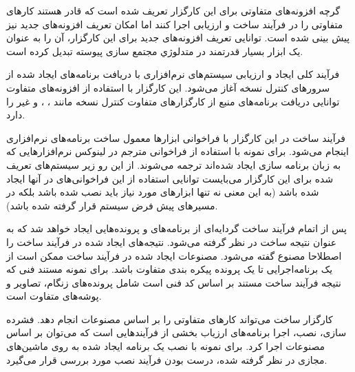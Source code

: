 گرچه افزونه‌های متفاوتی برای این کارگزار تعریف شده است که قادر هستند کارهای
متفاوتی را در فرآیند ساخت و ارزیابی اجرا کنند اما امکان تعریف افزونه‌های جدید
نیز پیش بینی شده است. توانایی تعریف افزونه‌های جدید برای این کارگزار، آن را به
عنوان یک ابزار بسیار قدرتمند در متدلوژي مجتمع سازی پیوسته تبدیل کرده است.

فرآیند کلی ایجاد و ارزیابی سیستم‌های نرم‌افزاری با دریافت برنامه‌های ایجاد شده
از سرورهای کنترل نسخه آغاز می‌شود. این کارگزار با استفاده از افزونه‌های متفاوت
توانایی دریافت برنامه‌های منبع از کارگزارهای متفاوت کنترل نسخه مانند ،
،  و غیر را دارد.

فرآیند ساخت در این کارگزار با فراخوانی ابزارها معمول ساخت برنامه‌های نرم‌افزاری
اینجام می‌شود. برای نمونه با استفاده از فراخوانی مترجم  در لینوکس
نرم‌افزارهایی که به زبان برنامه سازی  ایجاد شده‌اند ترجمه می‌شوند. از
این رو زیر سیستم‌های تعریف شده برای این کارگزار می‌بایست توانایی استفاده از این
فراخوانی‌های در آنها ایجاد شده باشد (به این معنی  نه تنها ابزارهای مورد نیاز
باید نصب شده باشد بلکه در مسیرهای پیش فرض سیستم قرار گرفته شده باشد).

پس از اتمام فرآیند ساخت گردایه‌ای از برنامه‌های و پرونده‌هایی ایجاد خواهد شد که
به عنوان نتیجه ساخت در نظر گرفته می‌شود. نتیجه‌های ایجاد شده در فرآیند ساخت را
اصطلاحا مصنوع گفته می‌شود. مصنوعات ایجاد شده در فرآیند
ساخت ممکن است از یک برنامه‌اجرایی تا یک پرونده پیکره بندی متفاوت باشد. برای
نمونه مستند فنی که نتیجه فرآیند ساخت مستند بر اساس کد فنی است شامل پرونده‌های
زنگام، تصاویر و پوشه‌های متفاوت است.

کارگزار ساخت می‌تواند کارهای متفاوتی را بر اساس مصنوعات انجام دهد. فشرده سازی،
نصب، اجرا برنامه‌های ارزیاب بخشی از فرآیندهایی است که می‌توان بر اساس مصنوعات
اجرا کرد. برای نمونه با نصب یک برنامه ایجاد شده به روی ماشین‌های مجازی در نظر
گرفته شده، درست بودن فرآیند نصب مورد بررسی قرار می‌گیرد.

